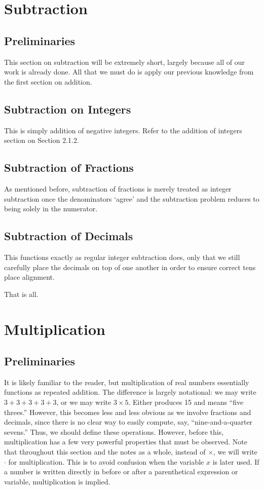 \documentclass[openany]{book}
\begin{document}
\section{Subtraction}
\subsection{Preliminaries}
This section on subtraction will be extremely short, largely because all of our work is already done.  All that we must do is apply our previous knowledge from the first section on addition.
\subsection{Subtraction on Integers}
This is simply addition of negative integers. Refer to the addition of integers section on Section 2.1.2.
\subsection{Subtraction of Fractions}
As mentioned before, subtraction of fractions is merely treated as integer subtraction once the denominators `agree' and the subtraction problem reduces to being solely in the numerator.
\subsection{Subtraction of Decimals}
This functions exactly as regular integer subtraction does, only that we still carefully place the decimals on top of one another in order to ensure correct tens place alignment.\par
That is all.

\section{Multiplication}
\subsection{Preliminaries}
It is likely familiar to the reader, but multiplication of real numbers essentially functions as repeated addition. The difference is largely notational: we may write $3+3+3+3+3$, or we may write $3\times5$. Either produces 15 and means ``five threes.'' However, this becomes less and less obvious as we involve fractions and decimals, since there is no clear way to easily compute, say, ``nine-and-a-quarter sevens.'' Thus, we should define these operations. However, before this, multiplication has a few very powerful properties that must be observed. Note that throughout this section and the notes as a whole, instead of $\times$, we will write $\cdot$ for multiplication. This is to avoid confusion when the variable $x$ is later used. If a number is written directly in before or after a parenthetical expression or variable, multiplication is implied.
\end{document}
